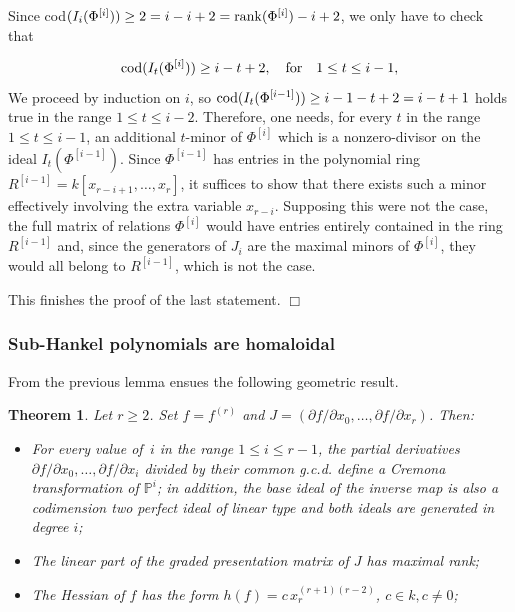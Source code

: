 \documentclass[11pt]{article}   %
\newtheorem{Theorem}{Theorem}
\theoremstyle{definition}
\numberwithin{Theorem}{section} \numberwithin{equation}{section}
\def\QED{\hfill$\Box$}
\def\qed{\QED}
\newcommand{\pp}{{\mathbb P}}
\begin{document}
{Since cod$(I_i(\Phi^{[i]}))\geq 2=i-i+2= {\rm rank}
(\Phi^{[i]})-i+2$, we only have to check that

\begin{equation}\label{f2}
{\rm cod} (I_t(\Phi^{[i]}))\geq i-t+2,\quad \mbox{\rm for}\quad
1\leq t\leq i-1,
\end{equation}
We proceed by induction on $i$, so ${\rm cod}
(I_t(\Phi^{[i-1]}))\geq i-1-t+2=i-t+1$ holds true in the range
$1\leq t\leq i-2$. Therefore, one needs, for every $t$ in the range
$1\leq t\leq i-1$, an additional $t$-minor of $\Phi^{[i]}$ which is
a nonzero-divisor on the ideal $I_t(\Phi^{[i-1]})$. Since
$\Phi^{[i-1]}$ has entries in the polynomial ring
$R^{[i-1]}=k[x_{r-i+1},\ldots, x_r]$, it suffices to show that there
exists such a minor effectively involving the extra variable
$x_{r-i}$. Supposing this were not the case, the full matrix of
relations $\Phi^{[i]}$ would have entries entirely contained in the
ring $R^{[i-1]}$ and, since the generators of $J_i$ are the maximal
minors of $\Phi^{[i]}$, they would all belong to $R^{[i-1]}$, which
is not the case.

This finishes the proof of the last statement.
\qed


\subsubsection{Sub-Hankel polynomials are homaloidal}\label {shp}

From the previous lemma ensues the following geometric result.


\begin{Theorem}\label{subhankel} Let $r\geq 2$.
Set $f=f^{(r)}$ and $J=(\partial f/\partial
x_0,\ldots,\partial f/\partial x_r)$. Then:

\begin{itemize}
\item[{\rm (i)}] For every value of $\,i$ in the range $1\leq i\leq r-1$,
the partial derivatives $\partial f/\partial x_0,\ldots,\partial
f/\partial x_{i}$ divided by their common g.c.d. define a Cremona
transformation of $\pp^i$; in addition, the base ideal of the
inverse map is also a codimension two perfect ideal of linear type
and both ideals are generated in degree $i${\rm ;}

\item[{\rm (ii)}] The linear part of
the graded presentation matrix of $J$ has maximal rank{\rm ;}

\item[{\rm (iii)}] The Hessian of $f$ has the form $h(f)=c\,x_r^ {(r+1)(r-2)}$,
 $c\in k, c\neq 0${\rm ;}


\end{itemize}
\end{Theorem}}
\end{document}

